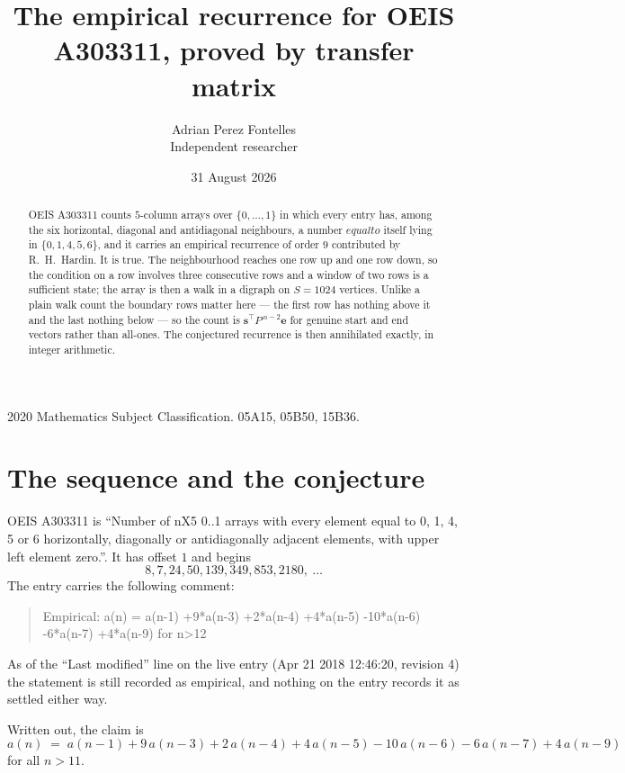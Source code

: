 \documentclass[11pt,a4paper]{article}
\title{The empirical recurrence for OEIS A303311, proved by transfer matrix}
\author{Adrian Perez Fontelles\\ \small Independent researcher}
\date{31 August 2026}
\theoremstyle{plain}
\theoremstyle{definition}
\begin{document}
\maketitle

\begin{abstract}
OEIS A303311 counts $5$-column arrays over $\{0,\dots,1\}$ in which every entry has,
among the six horizontal, diagonal and antidiagonal neighbours, a number $equal to$ itself lying in $\{0,1,4,5,6\}$, and it carries an empirical
recurrence of order $9$ contributed by R.~H.~Hardin. It is true. The neighbourhood
reaches one row up and one row down, so the condition on a row involves three consecutive
rows and a window of two rows is a sufficient state; the array is then a walk in a digraph
on $S=1024$ vertices. Unlike a plain walk count the boundary rows matter here --- the first
row has nothing above it and the last nothing below --- so the count is
$\mathbf{s}^{\!\top}P^{\,n-2}\mathbf{e}$ for genuine start and end vectors rather than
all-ones. The conjectured recurrence is then annihilated exactly, in integer arithmetic.
\end{abstract}

\noindent\small 2020 Mathematics Subject Classification. 05A15, 05B50, 15B36.\normalsize

\section{The sequence and the conjecture}

OEIS A303311 is ``Number of nX5 0..1 arrays with every element equal to 0, 1, 4, 5 or 6 horizontally, diagonally or antidiagonally adjacent elements, with upper left element zero.''. It has offset
$1$ and begins
\[
8, 7, 24, 50, 139, 349, 853, 2180,\ \dots
\]
The entry carries the following comment:
\begin{quote}\small
Empirical: a(n) = a(n-1) +9*a(n-3) +2*a(n-4) +4*a(n-5) -10*a(n-6) -6*a(n-7) +4*a(n-9) for n>12
\end{quote}
As of the ``Last modified'' line on the live entry (Apr 21 2018 12:46:20, revision
4) the statement is still recorded as empirical, and nothing on the entry
records it as settled either way.

Written out, the claim is
\begin{equation}\label{eq:conj}
a(n)\;=\;a(n-1) + 9\,a(n-3) + 2\,a(n-4) + 4\,a(n-5) - 10\,a(n-6) - 6\,a(n-7) + 4\,a(n-9)
\end{equation}
for all $n>11$.
\end{document}
